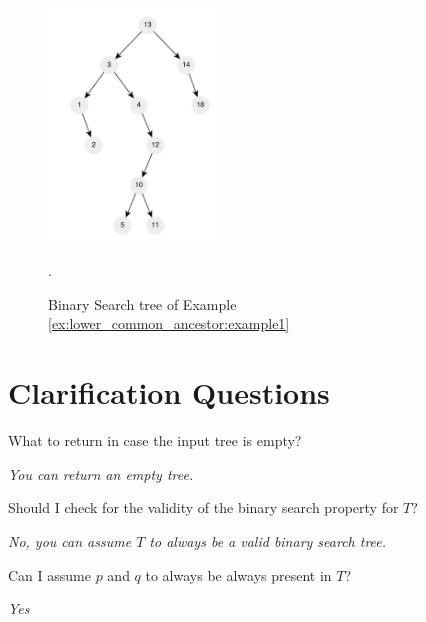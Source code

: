 \begin{figure}
	\centering
	\includegraphics[width=0.4\textwidth]{sources/lowest_common_ancestor/images/example1}
	\caption[Sample short cpation]{Binary Search tree of Example \ref{ex:lower_common_ancestor:example1}}.
	\label{fig:lowest_common_ancestor:example1}
\end{figure}

\section{Clarification Questions}

\begin{QandA}
	\item What to return in case the input tree is empty?
	\begin{answered}
		\textit{You can return an empty tree.}
	\end{answered}


	\item Should I check for the validity of the binary search property for $T$?
	\begin{answered}
		\textit{No, you can assume $T$ to always be a valid binary search tree.}
	\end{answered}

	\item Can I assume $p$ and $q$ to always be always present in $T$?
	\begin{answered}
		\textit{Yes}
	\end{answered}

	
\end{QandA}

